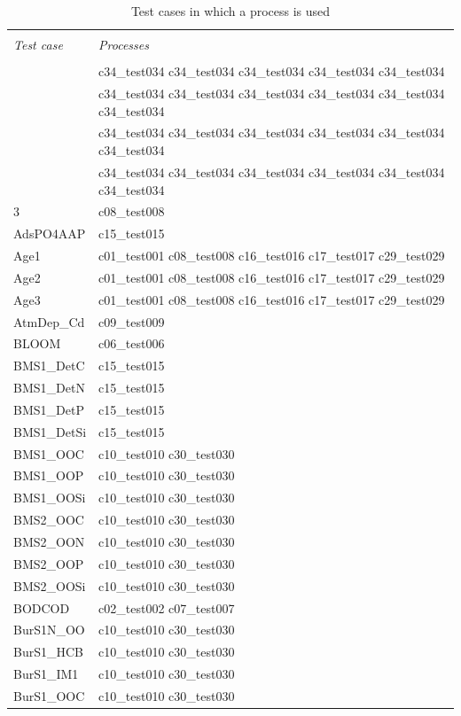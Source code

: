 
\begin{longtable}{ll}
\caption{Test cases in which a process is used} \\
\hline \\
\emph{Test case} & \emph{Processes} \\
\hline \\
 & c34\_test034 c34\_test034 c34\_test034 c34\_test034 c34\_test034 \\ 
 & c34\_test034 c34\_test034 c34\_test034 c34\_test034 c34\_test034 c34\_test034 \\ 
 & c34\_test034 c34\_test034 c34\_test034 c34\_test034 c34\_test034 c34\_test034 \\ 
 & c34\_test034 c34\_test034 c34\_test034 c34\_test034 c34\_test034 c34\_test034 \\
3 & c08\_test008 \\
AdsPO4AAP & c15\_test015 \\
Age1 & c01\_test001 c08\_test008 c16\_test016 c17\_test017 c29\_test029 \\
Age2 & c01\_test001 c08\_test008 c16\_test016 c17\_test017 c29\_test029 \\
Age3 & c01\_test001 c08\_test008 c16\_test016 c17\_test017 c29\_test029 \\
AtmDep\_Cd & c09\_test009 \\
BLOOM & c06\_test006 \\
BMS1\_DetC & c15\_test015 \\
BMS1\_DetN & c15\_test015 \\
BMS1\_DetP & c15\_test015 \\
BMS1\_DetSi & c15\_test015 \\
BMS1\_OOC & c10\_test010 c30\_test030 \\
BMS1\_OOP & c10\_test010 c30\_test030 \\
BMS1\_OOSi & c10\_test010 c30\_test030 \\
BMS2\_OOC & c10\_test010 c30\_test030 \\
BMS2\_OON & c10\_test010 c30\_test030 \\
BMS2\_OOP & c10\_test010 c30\_test030 \\
BMS2\_OOSi & c10\_test010 c30\_test030 \\
BODCOD & c02\_test002 c07\_test007 \\
BurS1N\_OO & c10\_test010 c30\_test030 \\
BurS1\_HCB & c10\_test010 c30\_test030 \\
BurS1\_IM1 & c10\_test010 c30\_test030 \\
BurS1\_OOC & c10\_test010 c30\_test030 \\

\end{longtable}
